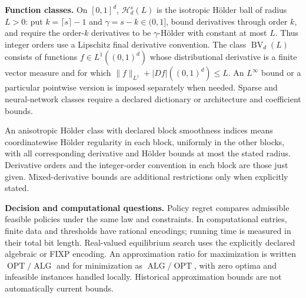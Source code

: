 \documentclass[11pt,a4paper]{article}
\begin{document}
\textbf{Function classes.}
On $[0,1]^d$, $\mathcal H_d^s(L)$ is the isotropic Hölder ball of radius
$L>0$: put $k=\lceil s\rceil-1$ and $\gamma=s-k\in(0,1]$, bound derivatives
through order $k$, and require the order-$k$ derivatives to be
$\gamma$-Hölder with constant at most $L$. Thus integer orders use a
Lipschitz final derivative convention. The class
$\operatorname{BV}_d(L)$ consists of functions $f\in L^1((0,1)^d)$ whose
distributional derivative is a finite vector measure and for which
$\|f\|_{L^1}+|Df|((0,1)^d)\leq L$.
An $L^\infty$ bound or a particular pointwise version is imposed separately
when needed. Sparse and neural-network classes require a declared
dictionary or architecture and coefficient bounds.

An anisotropic H\"older class with declared block smoothness indices means
coordinatewise H\"older regularity in each block, uniformly in the other
blocks, with all corresponding derivative and H\"older bounds at most
the stated radius. Derivative orders and the integer-order convention in
each block are those just given. Mixed-derivative bounds are additional
restrictions only when explicitly stated.

\textbf{Decision and computational questions.}
Policy regret compares admissible feasible policies under the same law and
constraints. In computational entries, finite data and thresholds have
rational encodings; running time is measured in their total bit length.
Real-valued equilibrium search uses the explicitly declared algebraic or
FIXP encoding. An approximation ratio for maximization is written
$\operatorname{OPT}/\operatorname{ALG}$ and for minimization as
$\operatorname{ALG}/\operatorname{OPT}$, with zero optima and infeasible
instances handled locally. Historical approximation bounds are not
automatically current bounds.
\end{document}
